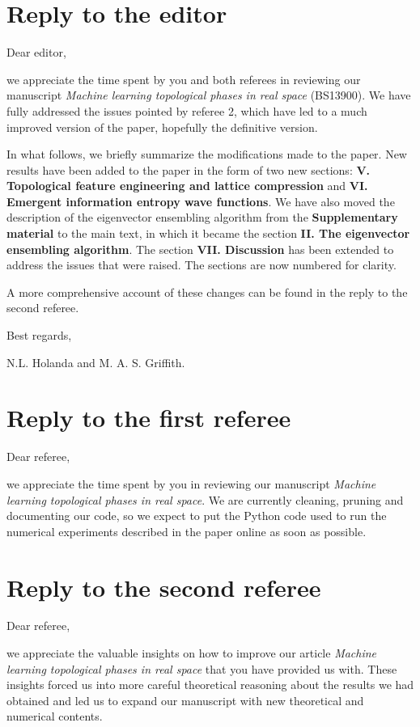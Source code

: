\documentclass[10pt]{revtex4-1}
\begin{document}
\section*{Reply to the editor}

Dear editor,

we appreciate the time spent by you and both referees in reviewing our manuscript \emph{Machine learning topological phases in real space} (BS13900). We have fully addressed the issues pointed by referee 2, which have led to a much improved version of the paper, hopefully the definitive version.   

In what follows, we briefly summarize the modifications made to the paper. New results have been added to the paper in the form of two new sections: \textbf{V. Topological feature engineering and lattice compression} and \textbf{VI. Emergent information entropy wave functions}. We have also moved the description of the eigenvector ensembling algorithm from the \textbf{Supplementary material} to the main text, in which it became the section \textbf{II. The eigenvector ensembling algorithm}. The section \textbf{VII. Discussion} has been extended to address the issues that were raised. The sections are now numbered for clarity.

A more comprehensive account of these changes can be found in the reply to the second referee.  

Best regards,

N.L. Holanda and M. A. S. Griffith.

\section*{Reply to the first referee}
Dear referee, 

we appreciate the time spent by you in reviewing our manuscript \emph{Machine learning topological phases in real space}. We are currently cleaning, pruning and documenting our code, so we expect to put the Python code used to run the numerical experiments described in the paper online as soon as possible.    

\section*{Reply to the second referee}
Dear referee,

we appreciate the valuable insights on how to improve our article \emph{Machine learning topological phases in real space} that you have provided us with. These insights forced us into more careful theoretical reasoning about the results we had obtained and led us to expand our manuscript with new theoretical and numerical contents. 
\end{document}
